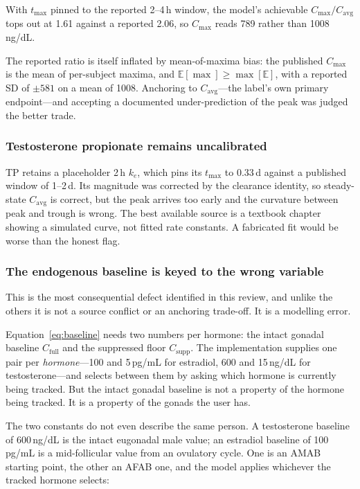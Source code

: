 \documentclass[11pt,a4paper]{article}
\begin{document}
With $t_{\max}$ pinned to the reported 2--4\,h window, the model's
achievable $C_{\max}/C_{\mathrm{avg}}$ tops out at 1.61 against a
reported 2.06, so $C_{\max}$ reads 789 rather than 1008\,ng/dL.

The reported ratio is itself inflated by mean-of-maxima bias: the
published $C_{\max}$ is the mean of per-subject maxima, and
$\mathbb{E}[\max] \ge \max[\mathbb{E}]$, with a reported SD of $\pm 581$
on a mean of 1008. Anchoring to $C_{\mathrm{avg}}$---the label's own
primary endpoint---and accepting a documented under-prediction of the
peak was judged the better trade.

\subsubsection{Testosterone propionate remains uncalibrated}
\label{sec:tp_limitation}

TP retains a placeholder 2\,h $k_e$, which pins its $t_{\max}$ to 0.33\,d
against a published window of 1--2\,d. Its magnitude was corrected by
the clearance identity, so steady-state $C_{\mathrm{avg}}$ is correct,
but the peak arrives too early and the curvature between peak and trough
is wrong. The best available source is a textbook chapter~\cite{behre2004}
showing a simulated curve, not fitted rate constants. A fabricated fit
would be worse than the honest flag.

\subsubsection{The endogenous baseline is keyed to the wrong variable}
\label{sec:baseline_limitation}

This is the most consequential defect identified in this review, and unlike
the others it is not a source conflict or an anchoring trade-off. It is a
modelling error.

Equation~\ref{eq:baseline} needs two numbers per hormone: the intact gonadal
baseline $C_{\text{full}}$ and the suppressed floor $C_{\text{supp}}$. The
implementation supplies one pair per \emph{hormone}---100 and 5\,pg/mL for
estradiol, 600 and 15\,ng/dL for testosterone---and selects between them by
asking which hormone is currently being tracked. But the intact gonadal
baseline is not a property of the hormone being tracked. It is a property of
the gonads the user has.

The two constants do not even describe the same person. A testosterone
baseline of 600\,ng/dL is the intact eugonadal male value; an estradiol
baseline of 100\,pg/mL is a mid-follicular value from an ovulatory cycle.
One is an AMAB starting point, the other an AFAB one, and the model applies
whichever the tracked hormone selects:
\end{document}
